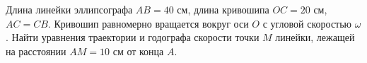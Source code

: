 Длина линейки эллипсографа $AB=40$ см, длина кривошипа $OC=20$ см, 
$AC=CB$. Кривошип равномерно вращается вокруг оси $O$ с угловой 
скоростью $\omega$. Найти уравнения траектории и годографа скорости 
точки $M$ линейки, лежащей на расстоянии $AM=10$ см от конца $A$.
